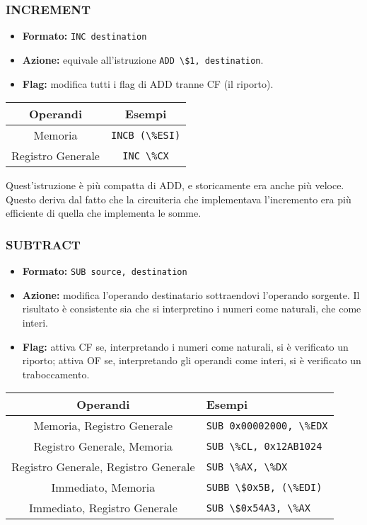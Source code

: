 \documentclass[a4paper,11pt]{article}
\begin{document}
\subsubsection{INCREMENT}
\begin{itemize}
	\item \textbf{Formato:} \lstinline|INC destination|
	\item \textbf{Azione:} equivale all'istruzione \lstinline|ADD \$1, destination|. 
	\item \textbf{Flag:} modifica tutti i flag di ADD tranne CF (il riporto).
\end{itemize}

		\begin{table}[H]
			\center {}
			\begin{tabular} { c | c }
				\bfseries Operandi & \bfseries Esempi \\
				\hline 
				Memoria & \lstinline|INCB (\%ESI)| \\
				Registro Generale & \lstinline|INC \%CX|
			\end{tabular}
		\end{table}

Quest'istruzione è più compatta di ADD, e storicamente era anche più veloce.
Questo deriva dal fatto che la circuiteria che implementava l'incremento era più efficiente di quella che implementa le somme.

\subsubsection{SUBTRACT}
\begin{itemize}
	\item \textbf{Formato:} \lstinline|SUB source, destination|
	\item \textbf{Azione:} modifica l'operando destinatario sottraendovi l'operando sorgente. 
		Il risultato è consistente sia che si interpretino i numeri come naturali, che come interi.
	\item \textbf{Flag:} attiva CF se, interpretando i numeri come naturali, si è verificato un riporto; attiva OF se, interpretando gli operandi come interi, si è verificato un traboccamento.
\end{itemize}

		\begin{table}[h!]
			\center {}
			\begin{tabular} { c | p{5cm} }
				\bfseries Operandi & \bfseries Esempi \\
				\hline
				Memoria, Registro Generale & \lstinline|SUB 0x00002000, \%EDX| \\ 
				Registro Generale, Memoria & \lstinline|SUB \%CL, 0x12AB1024| \\ 
				Registro Generale, Registro Generale & \lstinline|SUB \%AX, \%DX| \\ 
				Immediato, Memoria & \lstinline|SUBB \$0x5B, (\%EDI)| \\ 
				Immediato, Registro Generale & \lstinline|SUB \$0x54A3, \%AX|
			\end{tabular}
		\end{table}
\end{document}

